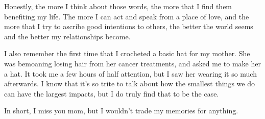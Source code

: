 \documentclass[12pt]{article}[titlepage]
\renewcommand{\,}{\textsuperscript{,}}
\begin{document}
Honestly, the more I think about those words, the more that I find them benefiting my life.  
The more I can act and speak from a place of love, and the more that I try to ascribe good intentions to others, the better the world seems and the better my relationships become.

I also remember the first time that I crocheted a basic hat for my mother.  
She was bemoaning losing hair from her cancer treatments, and asked me to make her a hat.  
It took me a few hours of half attention, but I saw her wearing it so much afterwards.  
I know that it's so trite to talk about how the smallest things we do can have the largest impacts, but I do truly find that to be the case.

In short, I miss you mom, but I wouldn't trade my memories for anything.  
\end{document}
